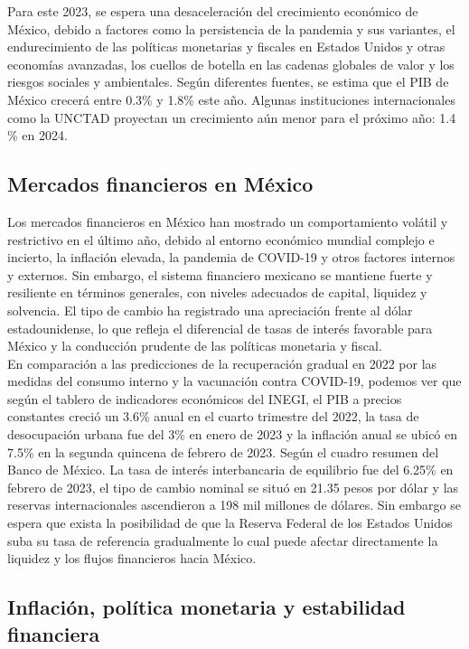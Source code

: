 \documentclass{article}
\theoremstyle{mytheoremstyle}
\theoremstyle{mytheoremstyle}
\theoremstyle{myproblemstyle}
\begin{document}
Para este 2023, se espera una desaceleración del crecimiento económico de México, debido a factores como la persistencia de la pandemia y sus variantes, el endurecimiento de las políticas monetarias y fiscales en Estados Unidos y otras economías avanzadas, los cuellos de botella en las cadenas globales de valor y los riesgos sociales y ambientales. Según diferentes fuentes, se estima que el PIB de México crecerá entre 0.3\% y 1.8\% este año. Algunas instituciones internacionales como la UNCTAD proyectan un crecimiento aún menor para el próximo año: 1.4 \% en 2024.\\

\subsection{Mercados financieros en México}

Los mercados financieros en México han mostrado un comportamiento volátil y restrictivo en el último año, debido al entorno económico mundial complejo e incierto, la inflación elevada, la pandemia de COVID-19 y otros factores internos y externos. Sin embargo, el sistema financiero mexicano se mantiene fuerte y resiliente en términos generales, con niveles adecuados de capital, liquidez y solvencia. El tipo de cambio ha registrado una apreciación frente al dólar estadounidense, lo que refleja el diferencial de tasas de interés favorable para México y la conducción prudente de las políticas monetaria y fiscal.\\

En comparación a las predicciones de la recuperación gradual en 2022 por las medidas del consumo interno y la vacunación contra COVID-19, podemos ver que según el tablero de indicadores económicos del INEGI, el PIB a precios constantes creció un 3.6\% anual en el cuarto trimestre del 2022,  la tasa de desocupación urbana fue del 3\% en enero de 2023 y la inflación anual se ubicó en 7.5\% en la segunda quincena de febrero de 2023. Según el cuadro resumen del Banco de México. La tasa de interés interbancaria de equilibrio fue del 6.25\% en febrero de 2023, el tipo de cambio nominal se situó en 21.35 pesos por dólar y las reservas internacionales ascendieron a 198 mil millones de dólares. Sin embargo se espera que exista la posibilidad de que la Reserva Federal de los Estados Unidos suba su tasa de referencia gradualmente lo cual puede afectar directamente la liquidez y los flujos financieros hacia México.

\subsection{Inflación, política monetaria y estabilidad financiera}
\end{document}
